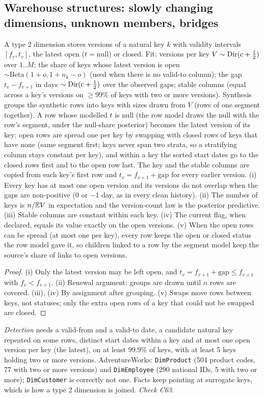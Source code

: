 \subsection{Warehouse structures: slowly changing dimensions, unknown members, bridges}
\begin{proposition}\label{prop:scd2}
A type 2 dimension stores versions of a natural key $k$ with validity intervals $[f_v,t_v]$, the latest open ($t=\text{null}$) or closed. Fit: versions per key $V\sim\operatorname{Dir}(c+\frac12)$ over $1..M$; the share of keys whose latest version is open $\sim\mathrm{Beta}(1+o,1+n_k-o)$ (used when there is no valid-to column); the gap $t_v-f_{v+1}$ in days $\sim\operatorname{Dir}(c+\frac12)$ over the observed gaps; stable columns (equal across a key's versions on $\ge99\%$ of keys with two or more versions). Synthesis groups the synthetic rows into keys with sizes drawn from $V$ (rows of one segment together). A row whose modelled $t$ is null (the row model draws the null with the row's segment, under the null-share posterior) becomes the latest version of its key: open rows are spread one per key by swapping with closed rows of keys that have none (same segment first; keys never span two strata, so a stratifying column stays constant per key), and within a key the sorted start dates go to the closed rows first and to the open row last. The key and the stable columns are copied from each key's first row and $t_v=f_{v+1}+\text{gap}$ for every earlier version. (i) Every key has at most one open version and its versions do not overlap when the gaps are non-positive (0 or $-1$ day, as in every clean history). (ii) The number of keys is $n/\mathbb{E} V$ in expectation and the version-count law is the posterior predictive. (iii) Stable columns are constant within each key. (iv) The current flag, when declared, equals its value exactly on the open versions. (v) When the open rows can be spread (at most one per key), every row keeps the open or closed status the row model gave it, so children linked to a row by the segment model keep the source's share of links to open versions.
\end{proposition}
\begin{proof}
(i) Only the latest version may be left open, and $t_v=f_{v+1}+\text{gap}\le f_{v+1}$ with $f_{v}<f_{v+1}$. (ii) Renewal argument: groups are drawn until $n$ rows are covered. (iii), (iv) By assignment after grouping. (v) Swaps move rows between keys, not statuses; only the extra open rows of a key that could not be swapped are closed.
\end{proof}
\noindent \emph{Detection} needs a valid-from and a valid-to date, a candidate natural key repeated on some rows, distinct start dates within a key and at most one open version per key (the latest), on at least 99.9\% of keys, with at least 5 keys holding two or more versions. AdventureWorks: \texttt{DimProduct} (504 product codes, 77 with two or more versions) and \texttt{DimEmployee} (290 national IDs, 5 with two or more); \texttt{DimCustomer} is correctly not one. Facts keep pointing at surrogate keys, which is how a type 2 dimension is joined. \emph{Check C63}.

